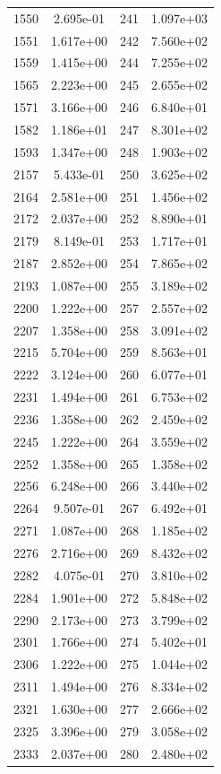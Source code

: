 \documentclass[12pt]{article}
\begin{document}
\begin{longtable}{@{}cccc@{}}
1550 & 2.695e-01 & 241 & 1.097e+03 \\
1551 & 1.617e+00 & 242 & 7.560e+02 \\
1559 & 1.415e+00 & 244 & 7.255e+02 \\
1565 & 2.223e+00 & 245 & 2.655e+02 \\
1571 & 3.166e+00 & 246 & 6.840e+01 \\
1582 & 1.186e+01 & 247 & 8.301e+02 \\
1593 & 1.347e+00 & 248 & 1.903e+02 \\
2157 & 5.433e-01 & 250 & 3.625e+02 \\
2164 & 2.581e+00 & 251 & 1.456e+02 \\
2172 & 2.037e+00 & 252 & 8.890e+01 \\
2179 & 8.149e-01 & 253 & 1.717e+01 \\
2187 & 2.852e+00 & 254 & 7.865e+02 \\
2193 & 1.087e+00 & 255 & 3.189e+02 \\
2200 & 1.222e+00 & 257 & 2.557e+02 \\
2207 & 1.358e+00 & 258 & 3.091e+02 \\
2215 & 5.704e+00 & 259 & 8.563e+01 \\
2222 & 3.124e+00 & 260 & 6.077e+01 \\
2231 & 1.494e+00 & 261 & 6.753e+02 \\
2236 & 1.358e+00 & 262 & 2.459e+02 \\
2245 & 1.222e+00 & 264 & 3.559e+02 \\
2252 & 1.358e+00 & 265 & 1.358e+02 \\
2256 & 6.248e+00 & 266 & 3.440e+02 \\
2264 & 9.507e-01 & 267 & 6.492e+01 \\
2271 & 1.087e+00 & 268 & 1.185e+02 \\
2276 & 2.716e+00 & 269 & 8.432e+02 \\
2282 & 4.075e-01 & 270 & 3.810e+02 \\
2284 & 1.901e+00 & 272 & 5.848e+02 \\
2290 & 2.173e+00 & 273 & 3.799e+02 \\
2301 & 1.766e+00 & 274 & 5.402e+01 \\
2306 & 1.222e+00 & 275 & 1.044e+02 \\
2311 & 1.494e+00 & 276 & 8.334e+02 \\
2321 & 1.630e+00 & 277 & 2.666e+02 \\
2325 & 3.396e+00 & 279 & 3.058e+02 \\
2333 & 2.037e+00 & 280 & 2.480e+02 \\

\end{longtable}
\end{document}
